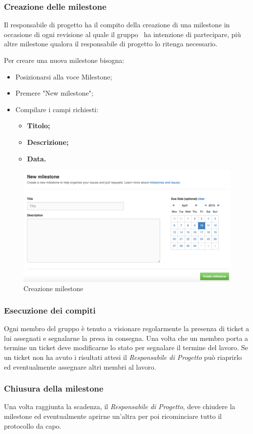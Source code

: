 \subsubsection{Creazione delle milestone}

Il responsabile di progetto ha il compito della creazione di una \gls{milestone} in occasione di ogni revisione al quale il gruppo \GRUPPO\ ha intenzione di partecipare, più altre \gls{milestone} qualora il responsabile di progetto lo ritenga necessario.

Per creare una nuova \gls{milestone} bisogna:

\begin{itemize}
	\item Posizionarsi alla voce \gls{Milestone};
	\item Premere "New \gls{milestone}";
	\item Compilare i campi richiesti:
		\begin{itemize}
			\item \textbf{Titolo;}
			\item \textbf{Descrizione;}
			\item \textbf{Data.}
		\end{itemize}
\end{itemize}
\begin{figure}[h]
\centering
\includegraphics[width=0.7\linewidth]{img/milestone}
\caption[Creazione milestone]{Creazione milestone}
\label{fig:milestone}
\end{figure}


\subsubsection{Esecuzione dei compiti}

Ogni membro del gruppo è tenuto a visionare regolarmente la presenza di \gls{ticket} a lui assegnati e segnalarne la presa in consegna.
Una volta che un membro porta a termine un \gls{ticket} deve modificarne lo stato per segnalare il termine del lavoro.
Se un \gls{ticket} non ha avuto i risultati attesi il \textit{Responsabile di Progetto} può riaprirlo ed eventualmente assegnare altri membri al lavoro.

\subsubsection{Chiusura della milestone}

Una volta raggiunta la scadenza, il \textit{Responsabile di Progetto}, deve chiudere la \gls{milestone} ed eventualmente aprirne un'altra per poi ricominciare tutto il protocollo da capo.

